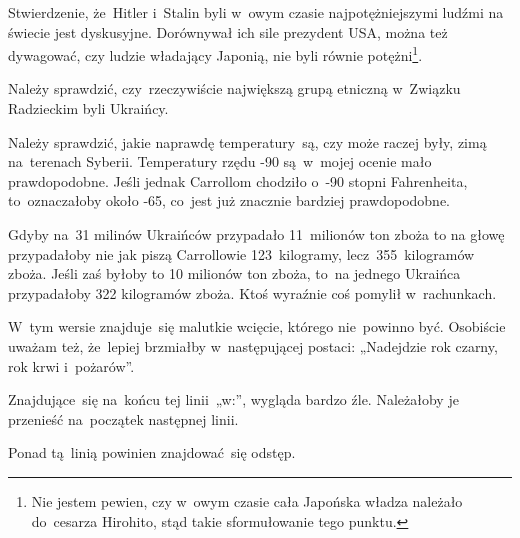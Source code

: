 \documentclass[a4paper,11pt]{article}
\numberwithin{equation}{section}
\begin{document}
\noindent
{} Stwierdzenie, że~Hitler i~Stalin byli w~owym czasie
najpotężniejszymi ludźmi na świecie jest dyskusyjne. Dorównywał ich
sile prezydent USA, można też dywagować, czy ludzie władający Japonią,
nie byli równie potężni\footnote{Nie jestem pewien, czy w~owym czasie
  cała Japońska władza należało do~cesarza Hirohito, stąd takie
  sformułowanie tego punktu.}.

\VerSpaceFour





\noindent
{} Należy sprawdzić, czy~rzeczywiście największą grupą etniczną
w~Związku Radzieckim byli Ukraińcy.

\VerSpaceFour





\noindent
{} Należy sprawdzić, jakie naprawdę temperatury~są, czy może raczej
były, zimą na~terenach Syberii. Temperatury rzędu -90\textcelsius
są~w~mojej ocenie mało prawdopodobne. Jeśli jednak Carrollom chodziło
o~-90 stopni Fahrenheita, to~oznaczałoby około -65\textcelsius, co~jest
już znacznie bardziej prawdopodobne.

\VerSpaceFour





\noindent
{} Gdyby na~31 milinów Ukraińców przypadało 11~milionów ton
zboża to na głowę przypadałoby nie jak piszą Carrollowie
123~kilogramy, lecz~355~kilogramów zboża. Jeśli zaś byłoby to 10
milionów ton zboża, to~na jednego Ukraińca przypadałoby 322 kilogramów
zboża. Ktoś wyraźnie coś pomylił w~rachunkach.

\VerSpaceFour





\noindent
{} W~tym wersie znajduje~się malutkie wcięcie, którego
nie~powinno być. Osobiście uważam też, że~lepiej brzmiałby w~następującej
postaci: „Nadejdzie rok czarny, rok krwi i~pożarów”.

\VerSpaceFour





\noindent
{} Znajdujące~się na~końcu tej linii~„w:”, wygląda bardzo
źle. Należałoby je przenieść na~początek następnej linii.

\VerSpaceFour





\noindent
{} Ponad tą~linią powinien znajdować~się odstęp.
\end{document}
